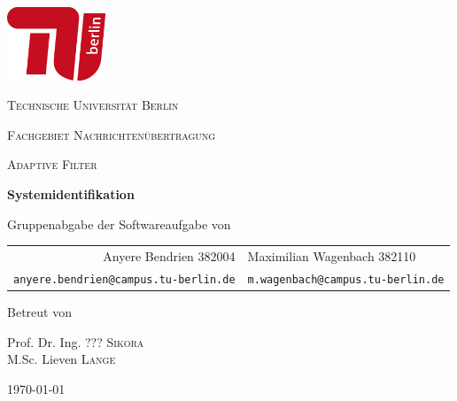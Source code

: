\begin{titlepage}
    \centering
    \includegraphics[height=62pt]{tu_red.png}\par
    {\scshape\huge Technische Universität Berlin \par}
    {\scshape\Large Fachgebiet Nachrichtenübertragung\par}
    \vspace{1.5cm}
    {\scshape\LARGE Adaptive Filter\par}
    \vspace{1.5cm}

    {\Huge\bfseries {Systemidentifikation}\par}
    \vspace{0.1cm}
    {\large Gruppenabgabe der Softwareaufgabe von\par}
    \vspace{1cm}

    {\itshape
        \begin{tabular}{rl}
          Anyere Bendrien 382004 &
          Maximilian Wagenbach 382110 \\
          \vspace{0.2cm}
          \small \texttt{anyere.bendrien@campus.tu-berlin.de} &
          \small \texttt{m.wagenbach@campus.tu-berlin.de}
        \end{tabular}
    }
    \vfill
    
    Betreut von\par
    Prof. Dr. Ing. ??? \textsc{Sikora} \\
    M.Sc. Lieven \textsc{Lange}
    \vspace{1cm}
    
    {\large \today\par}
\end{titlepage}